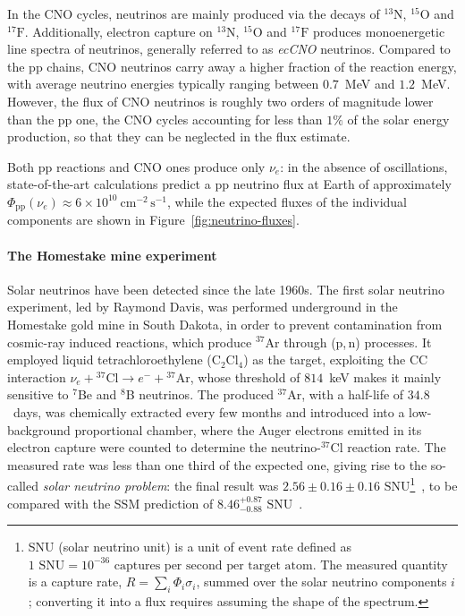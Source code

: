 In the \ac{CNO} cycles, neutrinos are mainly produced via the decays of ${}^{13}\text{N}$, ${}^{15}\text{O}$ and ${}^{17}\text{F}$. Additionally, electron capture on ${}^{13}\text{N}$, ${}^{15}\text{O}$ and ${}^{17}\text{F}$ produces monoenergetic line spectra of neutrinos, generally referred to as \textit{ecCNO} neutrinos. Compared to the \ac{pp} chains, \ac{CNO} neutrinos carry away a higher fraction of the reaction energy, with average neutrino energies typically ranging between $0.7$~MeV and $1.2$~MeV. However, the flux of \ac{CNO} neutrinos is roughly two orders of magnitude lower than the \ac{pp} one, the \ac{CNO} cycles accounting for less than $1\%$ of the solar energy production, so that they can be neglected in the flux estimate.

Both \ac{pp} reactions and \ac{CNO} ones produce only $\nu_e$: in the absence of oscillations, state-of-the-art calculations predict a \ac{pp} neutrino flux at Earth of approximately $\Phi_\text{pp}(\nu_e) \approx 6 \times 10^{10}~\text{cm}^{-2}\,\text{s}^{-1}$, while the expected fluxes of the individual components are shown in Figure~\ref{fig:neutrino-fluxes}.

\paragraph{The Homestake mine experiment}
Solar neutrinos have been detected since the late 1960s. The first solar neutrino experiment, led by Raymond Davis, was performed underground in the Homestake gold mine in South Dakota, in order to prevent contamination from cosmic-ray induced reactions, which produce ${}^{37}\text{Ar}$ through (p,\,n) processes. It employed liquid tetrachloroethylene (C$_2$Cl$_4$) as the target, exploiting the \ac{CC} interaction $\nu_e + {}^{37}\text{Cl} \longrightarrow e^- + {}^{37}\text{Ar}$, whose threshold of $814$~keV makes it mainly sensitive to ${}^{7}$Be and ${}^{8}$B neutrinos. The produced ${}^{37}\text{Ar}$, with a half-life of $34.8$~days, was chemically extracted every few months and introduced into a low-background proportional chamber, where the Auger electrons emitted in its electron capture were counted to determine the neutrino-${}^{37}\text{Cl}$ reaction rate. The measured rate was less than one third of the expected one, giving rise to the so-called \textit{solar neutrino problem}: the final result was $2.56 \pm 0.16 \pm 0.16 \text{ SNU}$\footnote{SNU (solar neutrino unit) is a unit of event rate defined as $1 \text{ SNU} = 10^{-36}\text{ captures per second per target atom}$. The measured quantity is a capture rate, $R = \sum_i \Phi_i \sigma_i$, summed over the solar neutrino components $i$; converting it into a flux requires assuming the shape of the spectrum.}~\cite{HomestakeResults}, to be compared with the \ac{SSM} prediction of $8.46^{+0.87}_{-0.88} \text{ SNU}$~\cite{SSMReference}.

